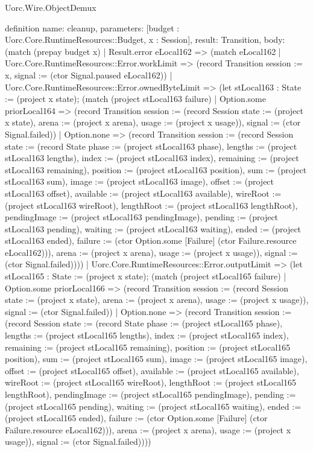 \begin{lexlean}{Uorc.Wire.ObjectDemux}
\begin{semanticmodule}
definition{
  name: cleanup,
  parameters: [budget : Uorc.Core.RuntimeResources::Budget, x : Session],
  result: Transition,
  body: (match (prepay budget x)
    | Result.error eLocal162 => (match eLocal162
      | Uorc.Core.RuntimeResources::Error.workLimit => (record Transition {session := x, signal := (ctor Signal.paused eLocal162)})
      | Uorc.Core.RuntimeResources::Error.ownedByteLimit => (let stLocal163 : State := (project x state); (match (project stLocal163 failure)
        | Option.some priorLocal164 => (record Transition {session := (record Session {state := (project x state), arena := (project x arena), usage := (project x usage)}), signal := (ctor Signal.failed)})
        | Option.none => (record Transition {session := (record Session {state := (record State {phase := (project stLocal163 phase), lengths := (project stLocal163 lengths), index := (project stLocal163 index), remaining := (project stLocal163 remaining), position := (project stLocal163 position), sum := (project stLocal163 sum), image := (project stLocal163 image), offset := (project stLocal163 offset), available := (project stLocal163 available), wireRoot := (project stLocal163 wireRoot), lengthRoot := (project stLocal163 lengthRoot), pendingImage := (project stLocal163 pendingImage), pending := (project stLocal163 pending), waiting := (project stLocal163 waiting), ended := (project stLocal163 ended), failure := (ctor Option.some [Failure] (ctor Failure.resource eLocal162))}), arena := (project x arena), usage := (project x usage)}), signal := (ctor Signal.failed)})))
      | Uorc.Core.RuntimeResources::Error.outputLimit => (let stLocal165 : State := (project x state); (match (project stLocal165 failure)
        | Option.some priorLocal166 => (record Transition {session := (record Session {state := (project x state), arena := (project x arena), usage := (project x usage)}), signal := (ctor Signal.failed)})
        | Option.none => (record Transition {session := (record Session {state := (record State {phase := (project stLocal165 phase), lengths := (project stLocal165 lengths), index := (project stLocal165 index), remaining := (project stLocal165 remaining), position := (project stLocal165 position), sum := (project stLocal165 sum), image := (project stLocal165 image), offset := (project stLocal165 offset), available := (project stLocal165 available), wireRoot := (project stLocal165 wireRoot), lengthRoot := (project stLocal165 lengthRoot), pendingImage := (project stLocal165 pendingImage), pending := (project stLocal165 pending), waiting := (project stLocal165 waiting), ended := (project stLocal165 ended), failure := (ctor Option.some [Failure] (ctor Failure.resource eLocal162))}), arena := (project x arena), usage := (project x usage)}), signal := (ctor Signal.failed)})))
}
\end{semanticmodule}
\end{lexlean}
